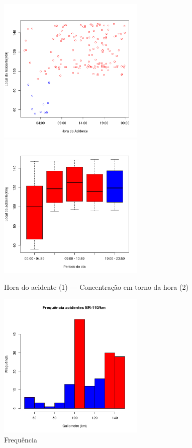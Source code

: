 \begin{figure}[h]
	\caption{Hora do acidente (1) --- Concentração em torno da hora (2) }
	\includegraphics[width=7cm,height=7cm]{Figuras/Preprocess/br110_1.png}
	\includegraphics[width=7cm,height=7cm]{Figuras/Preprocess/br110_2.png}

\end{figure}


\quad \quad
\begin{figure}[h]
	\centering
	\caption{ Frequência}
	\includegraphics[width=7cm,height=7cm]{Figuras/Preprocess/br110_3.png}
\end{figure}

